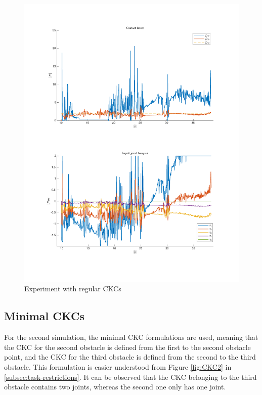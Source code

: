\begin{figure}
    \centering
    \includegraphics[trim=2cm 2cm 2cm 2cm, clip=true, width=\textwidth]{figures/experiments/2xf/bigJ-2plot.pdf}
    \caption{Experiment with regular CKCs}
    \label{fig:2xf-bigJ}
\end{figure}

\subsection{Minimal CKCs}

For the second simulation, the minimal CKC formulations are used, meaning that the CKC for the second obstacle is defined from the first to the second obstacle point, and the CKC for the third obstacle is defined from the second to the third obstacle. This formulation is easier understood from Figure \ref{fig:CKC2} in \ref{subsec:task-restrictions}. It can be observed that the CKC belonging to the third obstacle contains two joints, whereas the second one only has one joint.

